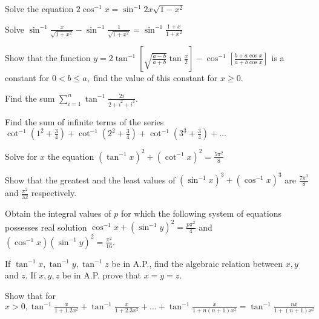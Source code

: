 \item Solve the equation $2\cos^{-1}x = \sin^{-1}2x\sqrt{1 - x^2}$
\item Solve $\sin^{-1}\frac{x}{\sqrt{1 + x^2}} - \sin^{-1}\frac{1}{\sqrt{1 + x^2}} = \sin^{-1}\frac{1 + x}{1 + x^2}$
\item Show that the function $y = 2\tan^{-1}\left[\sqrt{\frac{a - b}{a + b}}\tan\frac{x}{2}\right] - \cos^{-1}\left[\frac{b +
     a\cos x}{a + b\cos x}\right]$ is a constant for $0 < b \leq a,$ find the value of this constant for $x\geq 0.$
\item Find the sum $\sum_{i = 1}^n\tan^{-1}\frac{2i}{2 + i^2 + i^4}.$
\item Find the sum of infinite terms of the series $\cot^{-1}\left(1^2 + \frac{3}{4}\right) + \cot^{-1}\left(2^2 +
     \frac{3}{4}\right) + \cot^{-1}\left(3^3 + \frac{3}{4}\right) +\ldots$
\item Solve for $x$ the equation $(\tan^{-1}x)^2 + (\cot^{-1}x)^2 = \frac{5\pi^2}{8}$
\item Show that the greatest and the least values of $(\sin^{-1}x)^3 + (\cos^{-1}x)^3$ are $\frac{7\pi^3}{8}$ and
     $\frac{\pi^2}{32}$ respectively.
\item Obtain the integral values of $p$ for which the following system of equations possesses real solution
     $\cos^{-1}x + (\sin^{-1}y)^2 = \frac{p\pi^2}{4}$ and $(\cos^{-1}x)(\sin^{-1}y)^2 = \frac{\pi^2}{16}.$
\item If $\tan^{-1}x, \tan^{-1}y, \tan^{-1}z$ be in A.P., find the algebraic relation between $x, y$ and $z$.
     If $x, y, z$ be in A.P. prove that $x = y = z$.
\item Show that for $x > 0, \tan^{-1}\frac{x}{1 + 1.2x^2} + \tan^{-1}\frac{x}{1 + 2.3x^2} + \ldots +
     \tan^{-1}\frac{x}{1 + n(n + 1)x^2} = \tan^{-1}\frac{nx}{1 + (n + 1)x^2}$
\stopitemize
